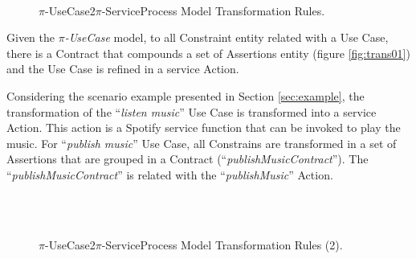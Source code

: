 \begin{figure}[ht!]
  \centering
  ~ %
  \\
  \caption{$\pi$-UseCase2$\pi$-ServiceProcess Model Transformation Rules.}
  \label{fig:modelRulesUS2SP}
\end{figure}

Given the \textit{$\pi$-UseCase} model, to all {\sc Constraint} entity related
with a {\sc Use Case}, there is a {\sc Contract} that compounds a set of {\sc
Assertions} entity (figure \ref{fig:trans01}) and the {\sc Use Case} is refined
in a service {\sc Action}.  

\begin{exampl}
Considering the scenario example presented in Section
\ref{sec:example}, the transformation of the ``\textit{listen music}'' {\sc Use
Case} is transformed into a service {\sc Action}. This action is a Spotify
service function that can be invoked to play the music. For ``\textit{publish music}''
{\sc Use Case}, all {\sc Constrains} are transformed in a set of
{\sc Assertions} that are grouped in a {\sc Contract}
(``\textit{publishMusicContract}''). The
``\textit{publishMusicContract}'' is related with the ``\textit{publishMusic}''
{\sc Action}.
\end{exampl}

 
\begin{figure}[ht!]
\centering
{}
~ %
\\
~ %
\caption{$\pi$-UseCase2$\pi$-ServiceProcess Model Transformation Rules (2).}
\label{fig:modelRulesUS2SP2}
\end{figure}

